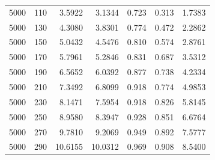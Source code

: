 \begin{tabular}{rrrrrrr}
  5000 & 110 & 3.5922 & 3.1344 & 0.723 & 0.313 & 1.7383 \\ 
  5000 & 130 & 4.3080 & 3.8301 & 0.774 & 0.472 & 2.2862 \\ 
  5000 & 150 & 5.0432 & 4.5476 & 0.810 & 0.574 & 2.8761 \\ 
  5000 & 170 & 5.7961 & 5.2846 & 0.831 & 0.687 & 3.5312 \\ 
  5000 & 190 & 6.5652 & 6.0392 & 0.877 & 0.738 & 4.2334 \\ 
  5000 & 210 & 7.3492 & 6.8099 & 0.918 & 0.774 & 4.9853 \\ 
  5000 & 230 & 8.1471 & 7.5954 & 0.918 & 0.826 & 5.8145 \\ 
  5000 & 250 & 8.9580 & 8.3947 & 0.928 & 0.851 & 6.6764 \\ 
  5000 & 270 & 9.7810 & 9.2069 & 0.949 & 0.892 & 7.5777 \\ 
  5000 & 290 & 10.6155 & 10.0312 & 0.969 & 0.908 & 8.5400 \\ 
   \hline
\end{tabular}
